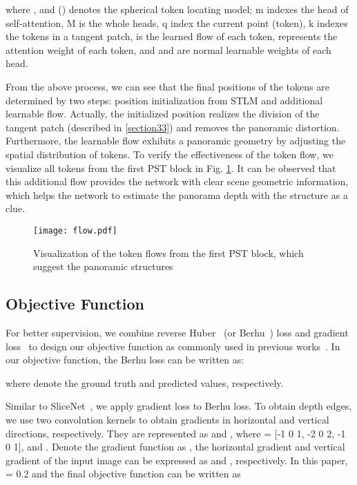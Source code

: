 \documentclass[runningheads]{llncs}
\begin{document}
where , and () denotes the spherical token locating model; m indexes the head of self-attention, M is the whole heads, q index the current point (token), k indexes the tokens in a tangent patch,  is the learned flow of each token,  represents the attention weight of each token, and  and  are normal learnable weights of each head.

From the above process, we can see that the final positions of the tokens are determined by two steps: position initialization from STLM and additional learnable flow. Actually, the initialized position realizes the division of the tangent patch (described in \ref{section33}) and removes the panoramic distortion. Furthermore, the learnable flow exhibits a panoramic geometry by adjusting the spatial distribution of tokens. To verify the effectiveness of the token flow, we visualize all tokens from the first PST block in Fig. \ref{fig:pos}. It can be observed that this additional flow provides the network with clear scene geometric information, which helps the network to estimate the panorama depth with the structure as a clue.
 
\begin{figure}[t]
  \centering
  \texttt{[image: flow.pdf]} \caption{Visualization of the token flows from the first PST block, which suggest the panoramic structures} \label{fig:pos}
\end{figure}

\subsection{Objective Function}
\label{section34}
For better supervision, we combine reverse Huber~\cite{esmaeili2019novel} (or Berhu~\cite{laina2016deeper}) loss and gradient loss~\cite{shen2021distortion} to design our objective function as commonly used in previous works~\cite{pintore2021slicenet,shen2021distortion}. In our objective function, the Berhu loss  can be written as:

where  denote the ground truth and predicted values, respectively.

Similar to SliceNet~\cite{pintore2021slicenet}, we apply gradient loss to Berhu loss. To obtain depth edges, we use two convolution kernels to obtain gradients in horizontal and vertical directions, respectively. They are represented as  and , where  = [-1 0 1, -2 0 2, -1 0 1], and . Denote the gradient function as , the horizontal gradient  and vertical gradient  of the input image  can be expressed as  and , respectively.
In this paper,  = 0.2 and the final objective function can be written as
\end{document}
